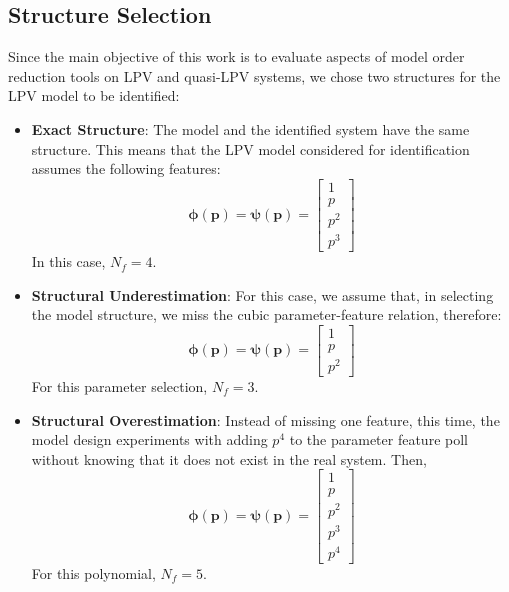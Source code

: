 \subsection{Structure Selection}

Since the main objective of this work is to evaluate aspects of model order reduction tools on LPV and quasi-LPV systems, we chose two structures for the LPV model to be identified:
\begin{itemize}
    \item \textbf{Exact Structure}: The model and the identified system have the same structure. This means that the LPV model considered for identification assumes the following features:
    \begin{equation}
        \boldsymbol{\phi(p)} = \boldsymbol{\psi(p)} = 
        \begin{bmatrix}
            1\\
            p\\
            p^2\\
            p^3
        \end{bmatrix}
    \end{equation}
    In this case, $N_f = 4$.
    \item \textbf{Structural Underestimation}: For this case, we assume that, in selecting the model structure, we miss the cubic parameter-feature relation, therefore:
    \begin{equation}
        \boldsymbol{\phi(p)} = \boldsymbol{\psi(p)} = 
        \begin{bmatrix}
            1\\
            p\\
            p^2
        \end{bmatrix}
    \end{equation}
    For this parameter selection, $N_f = 3$.
    \item \textbf{Structural Overestimation}: Instead of missing one feature, this time, the model design experiments with adding $p^4$ to the parameter feature poll without knowing that it does not exist in the real system. Then, 
    \begin{equation}
        \boldsymbol{\phi(p)} = \boldsymbol{\psi(p)} = 
        \begin{bmatrix}
            1\\
            p\\
            p^2\\
            p^3\\
            p^4
        \end{bmatrix}
    \end{equation}
    For this polynomial, $N_f = 5$.
\end{itemize}

